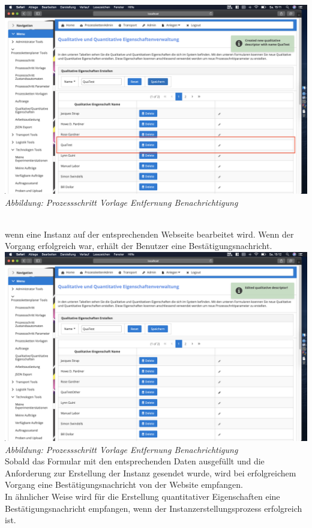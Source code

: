 \documentclass[enabledeprecatedfontcommands,fontsize=12pt,paper=a4,twoside]{scrartcl}
\begin{document}
\hypertarget{sc3.3.3.7}{
\includegraphics[width=1\textwidth]{Screenshots/336AddMeldung.png}
\textit{Abbildung: Prozessschritt Vorlage Entfernung Benachrichtigung}
} \\
wenn eine Instanz auf der entsprechenden Webseite bearbeitet wird. Wenn der Vorgang erfolgreich war, erhält der Benutzer eine Bestätigungsnachricht.\\
\hypertarget{sc3.3.3.7}{
\includegraphics[width=1\textwidth]{Screenshots/336EditQuali.png}
\textit{Abbildung: Prozessschritt Vorlage Entfernung Benachrichtigung}
} \\
Sobald das Formular mit den entsprechenden Daten ausgefüllt und die Anforderung zur Erstellung der Instanz gesendet wurde, wird bei erfolgreichem Vorgang eine Bestätigungsnachricht von der Website empfangen.\\
In ähnlicher Weise wird für die Erstellung quantitativer Eigenschaften eine Bestätigungsnachricht empfangen, wenn der Instanzerstellungsprozess erfolgreich ist.\\
\end{document}
